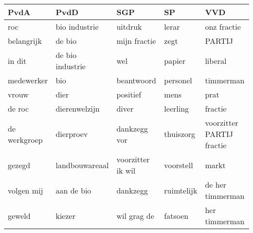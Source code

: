 \begin{tabular}{lllll}
\toprule
         PvdA &              PvdD &                SGP &          SP &                        VVD \\
\midrule
          roc &     bio industrie &            uitdruk &       lerar &                onz fractie \\
   belangrijk &            de bio &       mijn fractie &        zegt &                     PARTIJ \\
       in dit &  de bio industrie &                wel &      papier &                    liberal \\
   medewerker &               bio &         beantwoord &    personel &                  timmerman \\
        vrouw &              dier &           positief &        mens &                       prat \\
       de roc &     dierenwelzijn &              diver &    leerling &                    fractie \\
 de werkgroep &         dierproev &       dankzegg vor &   thuiszorg &  voorzitter PARTIJ fractie \\
       gezegd &    landbouwareaal &  voorzitter ik wil &   voorstell &                      markt \\
   volgen mij &        aan de bio &           dankzegg &  ruimtelijk &           de her timmerman \\
       geweld &            kiezer &        wil grag de &     fatsoen &              her timmerman \\
\bottomrule
\end{tabular}
